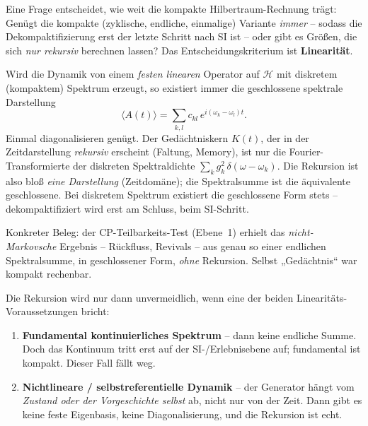 Eine Frage entscheidet, wie weit die kompakte Hilbertraum-Rechnung trägt:
Genügt die kompakte (zyklische, endliche, einmalige) Variante \emph{immer} --
sodass die Dekompaktifizierung erst der letzte Schritt nach SI ist -- oder gibt
es Größen, die sich \emph{nur rekursiv} berechnen lassen? Das
Entscheidungskriterium ist \textbf{Linearität}.

\begin{keyresult}
Wird die Dynamik von einem \emph{festen linearen} Operator auf $\mathcal{H}$
mit diskretem (kompaktem) Spektrum erzeugt, so existiert immer die geschlossene
spektrale Darstellung
\begin{equation}
  \langle A(t)\rangle=\sum_{k,l}c_{kl}\,e^{i(\omega_k-\omega_l)t}.
\end{equation}
Einmal diagonalisieren genügt. Der Gedächtniskern $K(t)$, der in der
Zeitdarstellung \emph{rekursiv} erscheint (Faltung, Memory), ist nur die
Fourier-Transformierte der diskreten Spektraldichte
$\sum_k g_k^2\,\delta(\omega-\omega_k)$. Die Rekursion ist also bloß
\emph{eine Darstellung} (Zeitdomäne); die Spektralsumme ist die äquivalente
geschlossene. Bei diskretem Spektrum existiert die geschlossene Form stets --
dekompaktifiziert wird erst am Schluss, beim SI-Schritt.
\end{keyresult}

Konkreter Beleg: der CP-Teilbarkeits-Test (Ebene~1) erhielt das
\emph{nicht-Markovsche} Ergebnis -- Rückfluss, Revivals -- aus genau so einer
endlichen Spektralsumme, in geschlossener Form, \emph{ohne} Rekursion. Selbst
„Gedächtnis`` war kompakt rechenbar.

\begin{important}
Die Rekursion wird nur dann unvermeidlich, wenn eine der beiden
Linearitäts-Voraussetzungen bricht:
\begin{enumerate}
  \item \textbf{Fundamental kontinuierliches Spektrum} -- dann keine endliche
        Summe. Doch das Kontinuum tritt erst auf der SI-/Erlebnisebene auf;
        fundamental ist kompakt. Dieser Fall fällt weg.
  \item \textbf{Nichtlineare / selbstreferentielle Dynamik} -- der Generator
        hängt vom \emph{Zustand oder der Vorgeschichte selbst} ab, nicht nur von
        der Zeit. Dann gibt es keine feste Eigenbasis, keine Diagonalisierung,
        und die Rekursion ist echt.
\end{enumerate}
\end{important}

